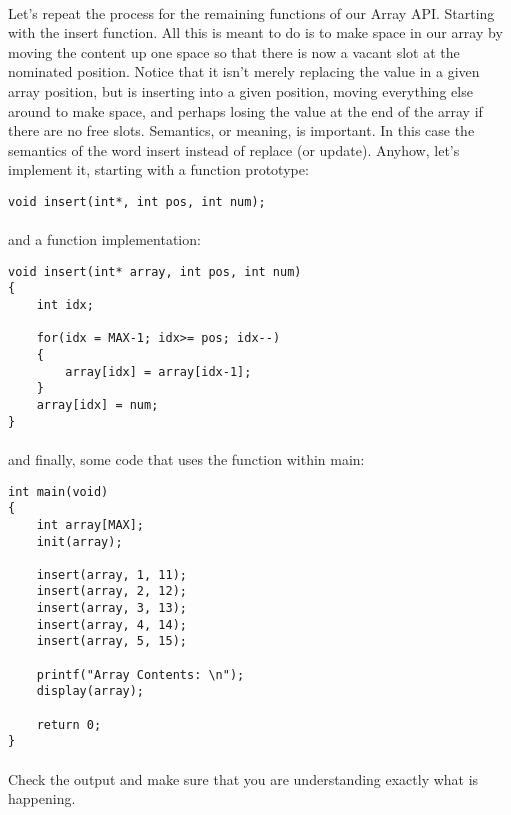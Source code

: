 \documentclass[10pt, a4paper, twosize]{article}
\begin{document}
\paragraph{}  Let's repeat the process for the remaining functions of our Array API. Starting with the insert function. All this is meant to do is to make space in our array by moving the content up one space so that there is now a vacant slot at the nominated position. Notice that it isn't merely replacing the value in a given array position, but is inserting into a given position, moving everything else around to make space, and perhaps losing the value at the end of the array if there are no free slots. Semantics, or meaning, is important. In this case the semantics of the word insert instead of replace (or update). Anyhow, let's implement it, starting with a function prototype:

\begin{lstlisting}
void insert(int*, int pos, int num);
\end{lstlisting}

\paragraph{} and a function implementation:

\begin{lstlisting}
void insert(int* array, int pos, int num)
{
    int idx;

    for(idx = MAX-1; idx>= pos; idx--)
    {
        array[idx] = array[idx-1];
    }
    array[idx] = num;
}
\end{lstlisting}

\paragraph{} and finally, some code that uses the function within main:
\begin{lstlisting}
int main(void)
{
    int array[MAX];
    init(array);

    insert(array, 1, 11);
    insert(array, 2, 12);
    insert(array, 3, 13);
    insert(array, 4, 14);
    insert(array, 5, 15);

    printf("Array Contents: \n");
    display(array);

    return 0;
}
\end{lstlisting}

\paragraph{} Check the output and make sure that you are understanding exactly what is happening.
\end{document}
